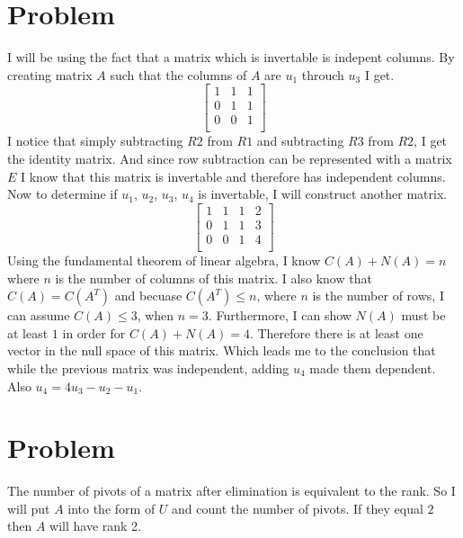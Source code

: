 \documentclass{article}
\begin{document}
\section{Problem}
I will be using the fact that a matrix which is invertable is indepent columns. By creating matrix $A$ such that the columns of $A$ are $u_{1}$ throuch $u_{3}$ I get.
\[
\begin{bmatrix}
1 & 1 & 1 \\
0 & 1 & 1 \\
0 & 0 & 1 \\
\end{bmatrix}
\]
I notice that simply subtracting $R2$ from $R1$ and subtracting $R3$ from $R2$, I get the identity matrix. And since row subtraction can be represented with a matrix $E$ I know that this matrix is invertable and therefore has independent columns.
Now to determine if $u_{1}$, $u_{2}$, $u_{3}$, $u_{4}$ is invertable, I will construct another matrix.
\[
\begin{bmatrix}
1 & 1 & 1 & 2 \\
0 & 1 & 1 & 3 \\
0 & 0 & 1 & 4 \\
\end{bmatrix}
\]
Using the fundamental theorem of linear algebra, I know $C(A) + N(A) = n$ where $n$ is the number of columns of this matrix. I also know that $C(A) = C(A^{T})$ and becuase $C(A^{T}) \le n$, where $n$ is the number of rows, I can assume $C(A) \le 3$, when $n = 3$. Furthermore, I can show $N(A)$ must be at least $1$ in order for $C(A) + N(A) = 4$. Therefore there is at least one vector in the null space of this matrix. Which leads me to the conclusion that while the previous matrix was independent, adding $u_{4}$ made them dependent. Also $u_{4} = 4u_{3} - u_{2} - u_{1}$.

\section{Problem}
The number of pivots of a matrix after elimination is equivalent to the rank. So I will put $A$ into the form of $U$ and count the number of pivots. If they equal $2$ then $A$ will have rank 2.
\end{document}
